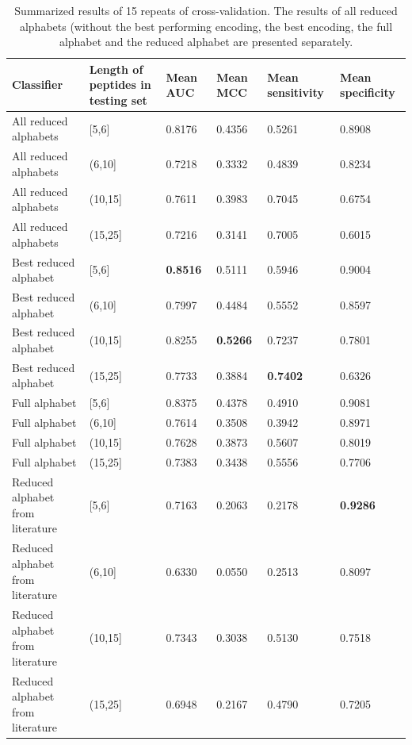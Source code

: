 \documentclass{bioinfo}
\begin{document}
\begin{table}[ht]
\centering
\caption{Summarized results of 15 repeats of cross-validation. The results of all reduced 
               alphabets (without the best performing encoding, the best encoding, the full 
               alphabet and the reduced alphabet are presented separately.} 
\label{tab:cv_summary}
\begin{tabular}{llllll}
  \toprule
Classifier & Length of peptides in testing set & Mean AUC & Mean MCC & Mean sensitivity & Mean specificity \\ 
  \midrule
All reduced alphabets & [5,6] & 0.8176 & 0.4356 & 0.5261 & 0.8908 \\ 
   \rowcolor[gray]{0.85}All reduced alphabets & (6,10] & 0.7218 & 0.3332 & 0.4839 & 0.8234 \\ 
  All reduced alphabets & (10,15] & 0.7611 & 0.3983 & 0.7045 & 0.6754 \\ 
   \rowcolor[gray]{0.85}All reduced alphabets & (15,25] & 0.7216 & 0.3141 & 0.7005 & 0.6015 \\ 
  Best reduced alphabet & [5,6] & \textbf{0.8516} & 0.5111 & 0.5946 & 0.9004 \\ 
   \rowcolor[gray]{0.85}Best reduced alphabet & (6,10] & 0.7997 & 0.4484 & 0.5552 & 0.8597 \\ 
  Best reduced alphabet & (10,15] & 0.8255 & \textbf{0.5266} & 0.7237 & 0.7801 \\ 
   \rowcolor[gray]{0.85}Best reduced alphabet & (15,25] & 0.7733 & 0.3884 & \textbf{0.7402} & 0.6326 \\ 
  Full alphabet & [5,6] & 0.8375 & 0.4378 & 0.4910 & 0.9081 \\ 
   \rowcolor[gray]{0.85}Full alphabet & (6,10] & 0.7614 & 0.3508 & 0.3942 & 0.8971 \\ 
  Full alphabet & (10,15] & 0.7628 & 0.3873 & 0.5607 & 0.8019 \\ 
   \rowcolor[gray]{0.85}Full alphabet & (15,25] & 0.7383 & 0.3438 & 0.5556 & 0.7706 \\ 
  Reduced alphabet from literature & [5,6] & 0.7163 & 0.2063 & 0.2178 & \textbf{0.9286} \\ 
   \rowcolor[gray]{0.85}Reduced alphabet from literature & (6,10] & 0.6330 & 0.0550 & 0.2513 & 0.8097 \\ 
  Reduced alphabet from literature & (10,15] & 0.7343 & 0.3038 & 0.5130 & 0.7518 \\ 
   \rowcolor[gray]{0.85}Reduced alphabet from literature & (15,25] & 0.6948 & 0.2167 & 0.4790 & 0.7205 \\ 
   \bottomrule
\end{tabular}
\end{table}
\end{document}
